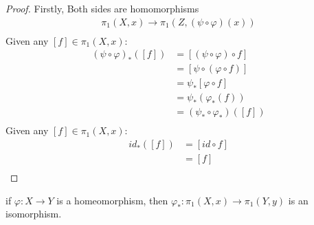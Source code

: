     \begin{proof}
        Firstly, Both sides are homomorphisms
            \begin{align*}
                \pi_1(X,x)\rightarrow\pi_1(Z,(\psi\circ\varphi)(x))\\
            \end{align*}
        Given any $[f]\in\pi_1(X,x)$:
            \begin{align*}
                (\psi\circ\varphi)_{*}([f])&=[(\psi\circ\varphi)\circ f]\\
                &=[\psi\circ(\varphi\circ f)]\\
                &=\psi_{*}[\varphi\circ f]\\
                &=\psi_{*}(\varphi_{*}(f))\\
                &=(\psi_{*}\circ\varphi_{*})([f])\\
            \end{align*}
        Given any $[f]\in\pi_1(X,x)$:
            \begin{align*}
                id_{*}([f])&=[id\circ f]\\
                &=[f]\\
            \end{align*}
    \end{proof}
    \begin{theorem} if $\varphi: X\rightarrow Y$ is a homeomorphism,
        then $\varphi_{*}: \pi_{1}(X,x)\rightarrow\pi_{1}(Y,y)$
        is an isomorphism.
    \end{theorem}
